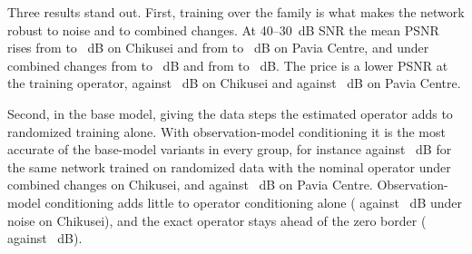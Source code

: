 \documentclass[journal]{IEEEtran}
\begin{document}
Three results stand out. First, training over the family is what makes the network robust to noise and to combined changes. At 40--30~dB SNR the mean PSNR rises from  to ~dB on Chikusei and from  to ~dB on Pavia Centre, and under combined changes from  to ~dB and from  to ~dB. The price is a lower PSNR at the training operator,  against ~dB on Chikusei and  against ~dB on Pavia Centre.

Second, in the base model, giving the data steps the estimated operator adds to randomized training alone. With observation-model conditioning it is the most accurate of the base-model variants in every group, for instance  against ~dB for the same network trained on randomized data with the nominal operator under combined changes on Chikusei, and  against ~dB on Pavia Centre. Observation-model conditioning adds little to operator conditioning alone ( against ~dB under noise on Chikusei), and the exact operator stays ahead of the zero border ( against ~dB).
\end{document}
